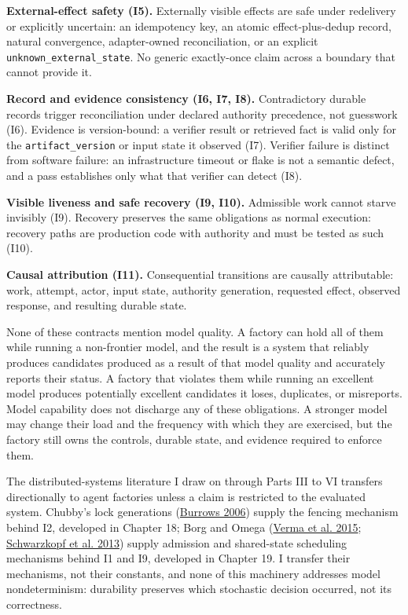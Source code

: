 \textbf{External-effect safety (I5).} Externally visible effects are safe under redelivery or explicitly uncertain: an idempotency key, an atomic effect-plus-dedup record, natural convergence, adapter-owned reconciliation, or an explicit \texttt{unknown\_external\_state}. No generic exactly-once claim across a boundary that cannot provide it.

\textbf{Record and evidence consistency (I6, I7, I8).} Contradictory durable records trigger reconciliation under declared authority precedence, not guesswork (I6). Evidence is version-bound: a verifier result or retrieved fact is valid only for the \texttt{artifact\_version} or input state it observed (I7). Verifier failure is distinct from software failure: an infrastructure timeout or flake is not a semantic defect, and a pass establishes only what that verifier can detect (I8).

\textbf{Visible liveness and safe recovery (I9, I10).} Admissible work cannot starve invisibly (I9). Recovery preserves the same obligations as normal execution: recovery paths are production code with authority and must be tested as such (I10).

\textbf{Causal attribution (I11).} Consequential transitions are causally attributable: work, attempt, actor, input state, authority generation, requested effect, observed response, and resulting durable state.

None of these contracts mention model quality. A factory can hold all of them while running a non-frontier model, and the result is a system that reliably produces candidates produced as a result of that model quality and accurately reports their status. A factory that violates them while running an excellent model produces potentially excellent candidates it loses, duplicates, or misreports. Model capability does not discharge any of these obligations. A stronger model may change their load and the frequency with which they are exercised, but the factory still owns the controls, durable state, and evidence required to enforce them.

The distributed-systems literature I draw on through Parts III to VI transfers directionally to agent factories unless a claim is restricted to the evaluated system. Chubby's lock generations (\href{https://www.usenix.org/conference/osdi-06/chubby-lock-service-loosely-coupled-distributed-systems}{Burrows 2006}) supply the fencing mechanism behind I2, developed in Chapter 18; Borg and Omega (\href{https://research.google/pubs/large-scale-cluster-management-at-google-with-borg/}{Verma et al. 2015}; \href{https://research.google/pubs/omega-flexible-scalable-schedulers-for-large-compute-clusters/}{Schwarzkopf et al. 2013}) supply admission and shared-state scheduling mechanisms behind I1 and I9, developed in Chapter 19. I transfer their mechanisms, not their constants, and none of this machinery addresses model nondeterminism: durability preserves which stochastic decision occurred, not its correctness.

